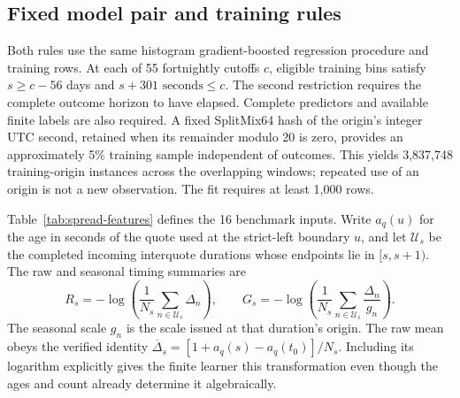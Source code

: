 \documentclass[12pt,letterpaper]{article}
\begin{document}
\subsection{Fixed model pair and training rules}

Both rules use the same histogram gradient-boosted regression procedure and training rows. At each of 55 fortnightly cutoffs $c$, eligible training bins satisfy $s\geq c-56$ days and $s+301\text{ seconds}\leq c$. The second restriction requires the complete outcome horizon to have elapsed. Complete predictors and available finite labels are also required. A fixed SplitMix64 hash of the origin's integer UTC second, retained when its remainder modulo 20 is zero, provides an approximately 5\% training sample independent of outcomes. This yields 3,837,748 training-origin instances across the overlapping windows; repeated use of an origin is not a new observation. The fit requires at least 1,000 rows.

Table~\ref{tab:spread-features} defines the 16 benchmark inputs. Write $a_q(u)$ for the age in seconds of the quote used at the strict-left boundary $u$, and let $\mathcal{U}_s$ be the completed incoming interquote durations whose endpoints lie in $[s,s+1)$. The raw and seasonal timing summaries are
\begin{equation}
 R_s=-\log\!\left(\frac{1}{N_s}\sum_{n\in\mathcal{U}_s}\Delta_n\right),
 \qquad
 G_s=-\log\!\left(\frac{1}{N_s}\sum_{n\in\mathcal{U}_s}\frac{\Delta_n}{g_n}\right).
 \label{eq:spread-raw-seasonal}
\end{equation}
The seasonal scale $g_n$ is the scale issued at that duration's origin. The raw mean obeys the verified identity $\overline\Delta_s=[1+a_q(s)-a_q(t_0)]/N_s$. Including its logarithm explicitly gives the finite learner this transformation even though the ages and count already determine it algebraically.
\end{document}
